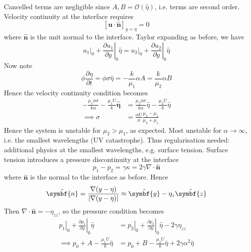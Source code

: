 \documentclass{jknotes}
\renewcommand{\u}{\symbf{u}}
\begin{document}
Cancelled terms are negligible since $A, B = \mathcal{O}(\hat{\eta})$, i.e. 
terms are second order. Velocity continuity at the interface requires
\begin{equation}
	\left[\u \cdot \hat{\symbf{n}}\right]_{y=\eta} = 0 
\end{equation}
where $\hat{\symbf{n}}$ is the unit normal to the interface.  Taylor expanding
as before, we have
\begin{equation}
	\left.u_1\right|_0 + \left. \frac{\partial u_1}{\partial y}\right|_0
	\hat{\eta} = \left.u_2\right|_0 + \left. \frac{\partial
	u_2}{\partial y} \right|_0 \hat{\eta}
\end{equation}
Now note
\begin{equation}
	\phi \frac{\partial \eta}{\partial t} = \phi \sigma \hat{\eta} =
	-\frac{k}{\mu_1} \alpha A = \frac{k}{\mu_2}\alpha B
\end{equation}
Hence the velocity continuity condition becomes
\begin{align}
	-\frac{\mu_1 \phi \sigma}{k \alpha} - \frac{\mu_1 U}{k}\hat{\symbf{\eta}}
	&= \frac{\mu_2 \phi \sigma}{k \alpha} \hat{\eta} - \frac{\mu_2
	U}{k}\hat{\eta}  \\
	\implies \sigma &= \frac{\alpha U}{\phi} \frac{\mu_2 - \mu_1}{\mu_2 + 
	\mu_1}
\end{align}
Hence the system is unstable for $\mu_2 > \mu_1$, as expected. Most unstable
for $\alpha \to \infty$, i.e. the smallest wavelengths (UV catastrophe).
Thus regularisation needed: additional physics at the smallest wavelengths,
e.g. surface tension. Surface tension introduces a pressure discontinuity at
the interface
\begin{equation}
	p_1 - p_2 = \gamma \kappa = 2\gamma \nabla \cdot \hat{\symbf{n}}
\end{equation}
where $\hat{\symbf{n}}$ is the normal to the interface as before. Hence
\begin{equation}
	\hat{\symbf{n}} = \frac{\nabla (y-\eta)}{\abs{\nabla(y-\eta)}} \approx
	\hat{\symbf{y}} - \eta_z \hat{\symbf{z}}
\end{equation}
Then $\nabla \cdot \symbf{\hat{n}} = -\eta_{zz}$, so the pressure condition
becomes
\begin{align}
	\left.p_1 \right|_0 + \left. \frac{\partial p_1}{\partial
y}\right|_0 \hat{\eta} &= \left.p_2 \right|_0 + \left. \frac{\partial p_2}{\partial
y}\right|_0 \hat{\eta} -2\gamma \eta_{zz} \\
\implies p_0 + A - \frac{\mu_1 U}{k}\hat{\eta} &= p_0 + B - \frac{\mu_2
U}{k}\hat{\eta} + 2\gamma \alpha^2 \hat{\eta}
\end{align}
\end{document}
